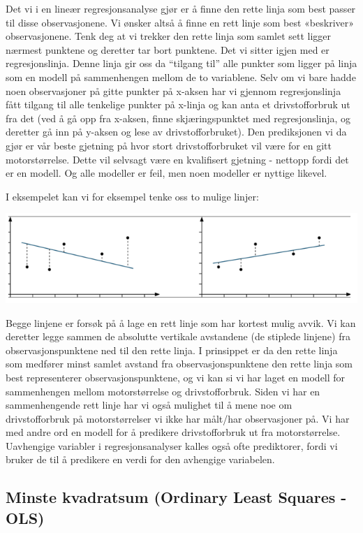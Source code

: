\documentclass[
]{article}
\begin{document}
Det vi i en lineær regresjonsanalyse gjør er å finne den rette linja som
best passer til disse observasjonene. Vi ønsker altså å finne en rett
linje som best «beskriver» observasjonene. Tenk deg at vi trekker den
rette linja som samlet sett ligger nærmest punktene og deretter tar bort
punktene. Det vi sitter igjen med er regresjonslinja. Denne linja gir
oss da ``tilgang til'' alle punkter som ligger på linja som en modell på
sammenhengen mellom de to variablene. Selv om vi bare hadde noen
observasjoner på gitte punkter på x-aksen har vi gjennom regresjonslinja
fått tilgang til alle tenkelige punkter på x-linja og kan anta et
drivstofforbruk ut fra det (ved å gå opp fra x-aksen, finne
skjæringspunktet med regresjonslinja, og deretter gå inn på y-aksen og
lese av drivstofforbruket). Den prediksjonen vi da gjør er vår beste
gjetning på hvor stort drivstofforbruket vil være for en gitt
motorstørrelse. Dette vil selvsagt være en kvalifisert gjetning -
nettopp fordi det er en modell. Og alle modeller er feil, men noen
modeller er nyttige likevel.

I eksempelet kan vi for eksempel tenke oss to mulige linjer:

\includegraphics{Teori_fig3.png}

Begge linjene er forsøk på å lage en rett linje som har kortest mulig
avvik. Vi kan deretter legge sammen de absolutte vertikale avstandene
(de stiplede linjene) fra observasjonspunktene ned til den rette linja.
I prinsippet er da den rette linja som medfører minst samlet avstand fra
observasjonspunktene den rette linja som best representerer
observasjonspunktene, og vi kan si vi har laget en modell for
sammenhengen mellom motorstørrelse og drivstofforbruk. Siden vi har en
sammenhengende rett linje har vi også mulighet til å mene noe om
drivstofforbruk på motorstørrelser vi ikke har målt/har observasjoner
på. Vi har med andre ord en modell for å predikere drivstofforbruk ut
fra motorstørrelse. Uavhengige variabler i regresjonsanalyser kalles
også ofte prediktorer, fordi vi bruker de til å predikere en verdi for
den avhengige variabelen.

\hypertarget{minste-kvadratsum-ordinary-least-squares---ols}{%
\subsection{Minste kvadratsum (Ordinary Least Squares -
OLS)}\label{minste-kvadratsum-ordinary-least-squares---ols}}
\end{document}
